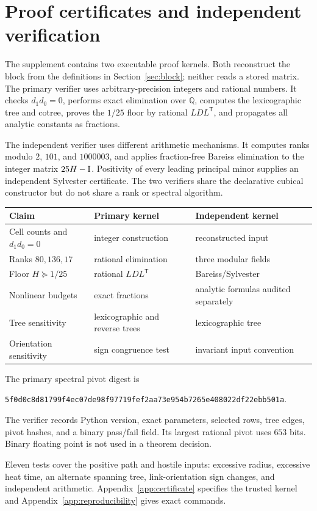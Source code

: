 \section{Proof certificates and independent verification}\label{sec:certificate}

The supplement contains two executable proof kernels.  Both reconstruct the
block from the definitions in Section~\ref{sec:block}; neither reads a stored
matrix.  The primary verifier uses arbitrary-precision integers and rational
numbers.  It checks $d_1d_0=0$, performs exact elimination over $\mathbb Q$,
computes the lexicographic tree and cotree, proves the $1/25$ floor by rational
$LDL^{\mathsf T}$, and propagates all analytic constants as fractions.

The independent verifier uses different arithmetic mechanisms.  It computes
ranks modulo $2$, $101$, and $1000003$, and applies fraction-free Bareiss
elimination to the integer matrix $25H-\mathrm I$.  Positivity of every leading
principal minor supplies an independent Sylvester certificate.  The two
verifiers share the declarative cubical constructor but do not share a rank or
spectral algorithm.

\begin{center}
\begin{tabular}{@{}lll@{}}
\toprule
Claim & Primary kernel & Independent kernel\\
\midrule
Cell counts and $d_1d_0=0$ & integer construction & reconstructed input\\
Ranks $80,136,17$ & rational elimination & three modular fields\\
Floor $H\succeq1/25$ & rational $LDL^{\mathsf T}$ & Bareiss/Sylvester\\
Nonlinear budgets & exact fractions & analytic formulas audited separately\\
Tree sensitivity & lexicographic and reverse trees & lexicographic tree\\
Orientation sensitivity & sign congruence test & invariant input convention\\
\bottomrule
\end{tabular}
\end{center}

The primary spectral pivot digest is
\begin{center}
\texttt{5f0d0c8d81799f4ec07de98f97719fef2aa73e954b7265e408022df22ebb501a}.
\end{center}
The verifier records Python version, exact parameters, selected rows, tree
edges, pivot hashes, and a binary pass/fail field.  Its largest rational pivot
uses $653$ bits.  Binary floating point is not used in a theorem decision.

Eleven tests cover the positive path and hostile inputs: excessive radius,
excessive heat time, an alternate spanning tree, link-orientation sign changes,
and independent arithmetic.  Appendix~\ref{app:certificate} specifies the
trusted kernel and Appendix~\ref{app:reproducibility} gives exact commands.
